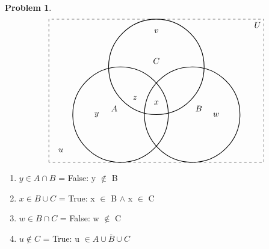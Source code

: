 \documentclass{article}
\theoremstyle{definition}
\newtheorem{problem}{Problem}[section]
\begin{document}
\begin{problem}
\[

\begin{tikzpicture}[scale=1.0]

  \draw[dashed] (-3,-2) rectangle (6,4);
  \node[anchor=north east] at (6,4) {$U$};

  \draw[thick] (0,0) circle (2) node[above left] {$A$};
  \draw[thick] (3,0) circle (2) node[above right] {$B$};
  \draw[thick] (1.5,2) circle (2) node[above] {$C$};

  \node at (-1,0) {$y$};       %
  \node at (4,0) {$w$};        %
  \node at (1.5,3.5) {$v$};     %
  \node at (1.5,0.5) {$x$};     %
  \node at (0.6,0.7) {$z$};       %
  \node at (-2.5,-1.5) {$u$};   %

\end{tikzpicture}
\]
    \begin{enumerate}[label=(\alph*)]
        Compute

        \item \(y \in A \cap B\) = False: y $\notin$ B
        \item \(x \in B \cup C\) = True: x $\in$ B $\land$ x $\in$ C
        \item \(w \in B \cap C\) = False: w $\notin$ C
        \item \(u \notin C\) = True: u $\in \overline{A \cup B \cup C}$

    \end{enumerate}
\end{problem}
\end{document}
